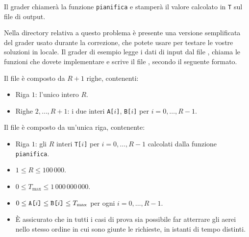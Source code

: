 \medskip

Il grader chiamerà la funzione \texttt{pianifica} e stamperà il valore calcolato in \texttt{T} sul file di output.



\Grader
Nella directory relativa a questo problema è presente una versione semplificata del grader usato durante la correzione, che potete usare per testare le vostre soluzioni in locale. Il grader di esempio legge i dati di input dal file , chiama le funzioni che dovete implementare e scrive il file \outputfile{}, secondo il seguente formato.

Il file  è composto da $R+1$ righe, contenenti:
\begin{itemize}[nolistsep,itemsep=2mm]
\item Riga $1$: l'unico intero $R$.
\item Righe $2,\ldots, R+1$: i due interi \texttt{A[$i$]}, \texttt{B[$i$]} per $i = 0,\ldots, R-1$.
\end{itemize}

Il file \outputfile{} è composto da un'unica riga, contenente:
\begin{itemize}[nolistsep,itemsep=2mm]
\item Riga $1$: gli $R$ interi \texttt{T[$i$]} per $i = 0,\ldots, R-1$ calcolati dalla funzione \texttt{pianifica}.
\end{itemize}



\Constraints

\begin{itemize}[nolistsep, itemsep=2mm]
	\item $1 \le R \le 100\,000$.
	\item $0 \le T_{\text{max}} \le 1\,000\,000\,000$.
	\item $0 \le \text{\texttt{A[$i$]}} \le \text{\texttt{B[$i$]}} \le T_{\text{max}}$ per ogni $i=0,\ldots, R-1$.
	\item È assicurato che in tutti i casi di prova sia possibile far atterrare gli aerei nello stesso ordine in cui sono giunte le richieste, in istanti di tempo distinti.
\end{itemize}

